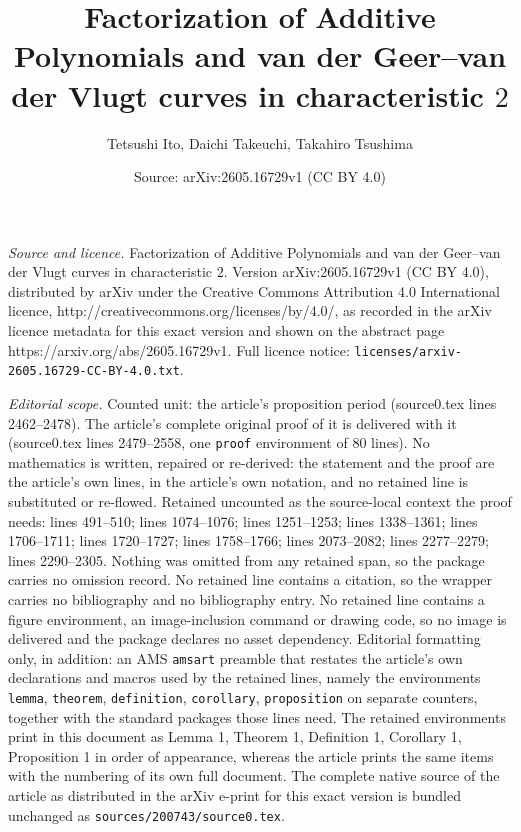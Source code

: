 \documentclass[10pt,a4paper]{amsart}
\title{Factorization of Additive Polynomials and van der Geer--van der Vlugt curves in characteristic $2$}
\author{Tetsushi Ito, Daichi Takeuchi, Takahiro Tsushima}
\date{Source: arXiv:2605.16729v1 (CC BY 4.0)}
\begin{document}
\maketitle

\noindent\emph{Source and licence.} Factorization of Additive Polynomials and van der Geer--van der Vlugt curves in characteristic $2$. Version arXiv:2605.16729v1 (CC BY 4.0), distributed by arXiv under the Creative Commons Attribution 4.0 International licence, http://creativecommons.org/licenses/by/4.0/, as recorded in the arXiv licence metadata for this exact version and shown on the abstract page https://arxiv.org/abs/2605.16729v1. Full licence notice: \texttt{licenses/arxiv-2605.16729-CC-BY-4.0.txt}.\par\smallskip

\noindent\textit{Editorial scope.} Counted unit: the article's proposition period (source0.tex lines 2462--2478). The article's complete original proof of it is delivered with it (source0.tex lines 2479--2558, one \texttt{proof} environment of 80 lines). No mathematics is written, repaired or re-derived: the statement and the proof are the article's own lines, in the article's own notation, and no retained line is substituted or re-flowed.  Retained uncounted as the source-local context the proof needs: lines 491--510; lines 1074--1076; lines 1251--1253; lines 1338--1361; lines 1706--1711; lines 1720--1727; lines 1758--1766; lines 2073--2082; lines 2277--2279; lines 2290--2305.  Nothing was omitted from any retained span, so the package carries no omission record.  No retained line contains a citation, so the wrapper carries no bibliography and no bibliography entry.  No retained line contains a figure environment, an image-inclusion command or drawing code, so no image is delivered and the package declares no asset dependency.  Editorial formatting only, in addition: an AMS \texttt{amsart} preamble that restates the article's own declarations and macros used by the retained lines, namely the environments \texttt{lemma}, \texttt{theorem}, \texttt{definition}, \texttt{corollary}, \texttt{proposition} on separate counters, together with the standard packages those lines need.  The retained environments print in this document as Lemma 1, Theorem 1, Definition 1, Corollary 1, Proposition 1 in order of appearance, whereas the article prints the same items with the numbering of its own full document.  The complete native source of the article as distributed in the arXiv e-print for this exact version is bundled unchanged as \texttt{sources/200743/source0.tex}.
\end{document}
